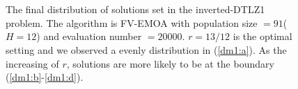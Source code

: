 \documentclass[conference]{IEEEtran}
\begin{document}
\begin{figure}[!t]
  \centering
  \quad
  \\
  \quad
  \\
  \caption{The final distribution of solutions set in the inverted-DTLZ1 problem.
  The algorithm is FV-EMOA with population size $=91$($H=12$) and evaluation number $=20000$.
  $r=13/12$ is the optimal setting and we observed a evenly distribution in (\ref{dm1:a}).
  As the increasing of $r$, solutions are more likely to be at the boundary
  (\ref{dm1:b}-\ref{dm1:d}). 
  }
  \label{dm1}
\end{figure}

%
% 
\end{document}
